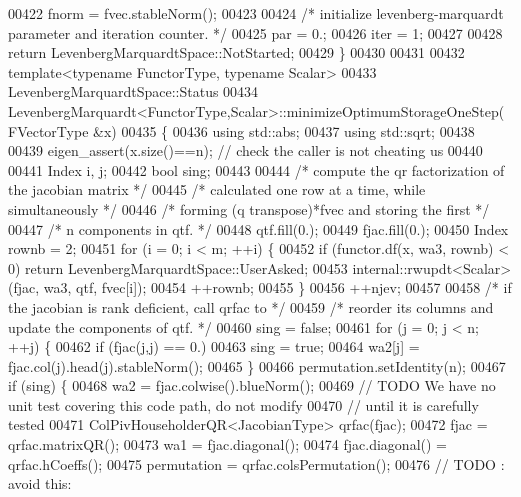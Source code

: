 \begin{DoxyCode}
00422     fnorm = fvec.stableNorm();
00423 
00424     \textcolor{comment}{/*     initialize levenberg-marquardt parameter and iteration counter. */}
00425     par = 0.;
00426     iter = 1;
00427 
00428     \textcolor{keywordflow}{return} LevenbergMarquardtSpace::NotStarted;
00429 \}
00430 
00431 
00432 \textcolor{keyword}{template}<\textcolor{keyword}{typename} FunctorType, \textcolor{keyword}{typename} Scalar>
00433 LevenbergMarquardtSpace::Status
00434 LevenbergMarquardt<FunctorType,Scalar>::minimizeOptimumStorageOneStep(FVectorType  &x)
00435 \{
00436     \textcolor{keyword}{using} std::abs;
00437     \textcolor{keyword}{using} std::sqrt;
00438     
00439     eigen\_assert(x.size()==n); \textcolor{comment}{// check the caller is not cheating us}
00440 
00441     Index i, j;
00442     \textcolor{keywordtype}{bool} sing;
00443 
00444     \textcolor{comment}{/* compute the qr factorization of the jacobian matrix */}
00445     \textcolor{comment}{/* calculated one row at a time, while simultaneously */}
00446     \textcolor{comment}{/* forming (q transpose)*fvec and storing the first */}
00447     \textcolor{comment}{/* n components in qtf. */}
00448     qtf.fill(0.);
00449     fjac.fill(0.);
00450     Index rownb = 2;
00451     \textcolor{keywordflow}{for} (i = 0; i < m; ++i) \{
00452         \textcolor{keywordflow}{if} (functor.df(x, wa3, rownb) < 0) \textcolor{keywordflow}{return} LevenbergMarquardtSpace::UserAsked;
00453         internal::rwupdt<Scalar>(fjac, wa3, qtf, fvec[i]);
00454         ++rownb;
00455     \}
00456     ++njev;
00457 
00458     \textcolor{comment}{/* if the jacobian is rank deficient, call qrfac to */}
00459     \textcolor{comment}{/* reorder its columns and update the components of qtf. */}
00460     sing = \textcolor{keyword}{false};
00461     \textcolor{keywordflow}{for} (j = 0; j < n; ++j) \{
00462         \textcolor{keywordflow}{if} (fjac(j,j) == 0.)
00463             sing = \textcolor{keyword}{true};
00464         wa2[j] = fjac.col(j).head(j).stableNorm();
00465     \}
00466     permutation.setIdentity(n);
00467     \textcolor{keywordflow}{if} (sing) \{
00468         wa2 = fjac.colwise().blueNorm();
00469         \textcolor{comment}{// TODO We have no unit test covering this code path, do not modify}
00470         \textcolor{comment}{// until it is carefully tested}
00471         ColPivHouseholderQR<JacobianType> qrfac(fjac);
00472         fjac = qrfac.matrixQR();
00473         wa1 = fjac.diagonal();
00474         fjac.diagonal() = qrfac.hCoeffs();
00475         permutation = qrfac.colsPermutation();
00476         \textcolor{comment}{// TODO : avoid this:}

\end{DoxyCode}
